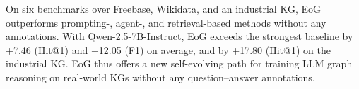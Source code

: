 On six benchmarks over Freebase, Wikidata, and an industrial KG, EoG outperforms prompting-, agent-, and retrieval-based methods without any annotations. With Qwen-2.5-7B-Instruct, EoG exceeds the strongest baseline by +7.46 (Hit@1) and +12.05 (F1) on average, and by +17.80 (Hit@1) on the industrial KG. EoG thus offers a new self-evolving path for training LLM graph reasoning on real-world KGs without any question--answer annotations.
